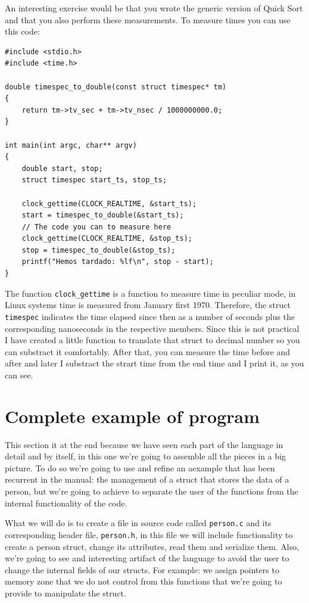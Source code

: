 \documentclass[a4paper]{article}
\begin{document}
An interesting exercise would be that you wrote the generic version of Quick
Sort and that you also perform these measurements. To measure times you can use
this code:

\noindent
\begin{minipage}[H]{\linewidth}
\mbox{}
\begin{lstlisting}[style=C,
caption={How to measure time},
label={lst:measure_times}]
#include <stdio.h>
#include <time.h>

double timespec_to_double(const struct timespec* tm)
{
    return tm->tv_sec + tm->tv_nsec / 1000000000.0;
}

int main(int argc, char** argv)
{
    double start, stop;
    struct timespec start_ts, stop_ts;

    clock_gettime(CLOCK_REALTIME, &start_ts);
    start = timespec_to_double(&start_ts);
    // The code you can to measure here
    clock_gettime(CLOCK_REALTIME, &stop_ts);
    stop = timespec_to_double(&stop_ts);
    printf("Hemos tardado: %lf\n", stop - start);
}
\end{lstlisting}
\end{minipage}

The function \verb!clock_gettime! is a function to measure time in peculiar
mode, in Linux systems time is measured from January first 1970. Therefore,
the struct \verb!timespec! indicates the time elapsed since then as a number
of seconds plus the corresponding nanoseconds in the respective members. Since
this is not practical I have created a little function to translate that struct
to decimal number so you can substract it comfortably. After that, you can
measure the time before and after and later I substract the strart time from the
end time and I print it, as you can see.

\section{Complete example of program}
This section it at the end because we have seen each part of the language in
detail and by itself, in this one we're going to assemble all the pieces in a
big picture. To do so we're going to use and refine an aexample that has been
recurrent in the manual: the management of a struct that stores the data of a
person, but we're going to achieve to separate the user of the functions from
the internal functionality of the code.

What we will do is to create a file in source code called \verb!person.c! and
its corresponding header file, \verb!person.h!, in this file we will include
functionality to create a person struct, change its attributes, read them and
serialize them. Also, we're going to see and interesting artifact of the
language to avoid the user to change the internal fields of our structs. For
example: we assign pointers to memory zone that we do not control from this
functions that we're going to provide to manipulate the struct.
\end{document}
